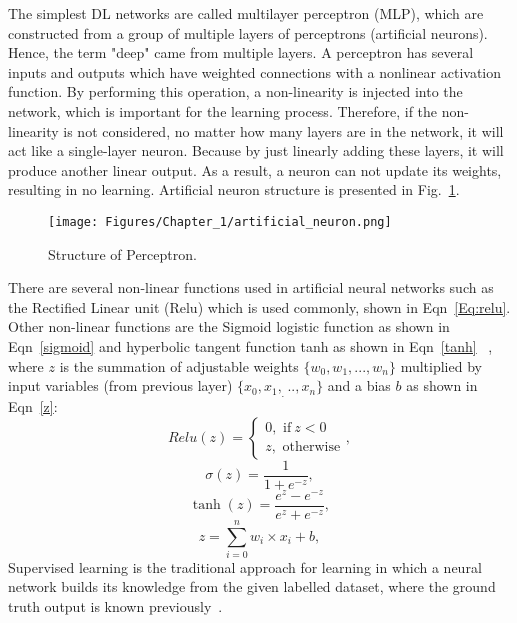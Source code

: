The simplest DL networks are called multilayer perceptron (MLP), which are constructed from a group of multiple layers of perceptrons (artificial neurons).
Hence, the term "deep" came from multiple layers.
A perceptron has several inputs and outputs which have weighted connections with a nonlinear activation function.
By performing this operation, a non-linearity is injected into the network, which is important for the learning process.
Therefore, if the non-linearity is not considered, no matter how many layers are in the network, it will act like a single-layer neuron. 
Because by just linearly adding these layers, it will produce another linear output.
As a result, a neuron can not update its weights, resulting in no learning. 
Artificial neuron structure is presented in Fig.~\ref{fig:artificial Neuron}.
\begin{figure} [!ht]
	\begin{center}
		\centering
		\texttt{[image: Figures/Chapter\_1/artificial\_neuron.png]}
	\end{center}
	\caption{Structure of Perceptron.} 
	\label{fig:artificial Neuron}
\end{figure}
There are several non-linear functions used in artificial neural networks such as the Rectified Linear unit (Relu) which is used commonly, shown in Eqn~\ref{Eq:relu}. Other non-linear functions are the Sigmoid logistic function as shown in Eqn~\ref{sigmoid} and hyperbolic tangent function tanh as shown in Eqn~\ref{tanh} ~\cite{Lecun2015}, where \(z\) is the summation of adjustable weights \(\{w_0,w_1,...,w_n \}\) multiplied by input variables (from previous layer) \(\{x_0,x_1,_...,x_n\}\) and a bias \(b\) as shown in Eqn~\ref{z}:
\begin{equation}
	Relu(z) = 
	\begin{cases}
		0,  \text{  if}\ z<0\\
		z,  \text{  otherwise}
	\end{cases},
	\label{Eq:relu}
\end{equation}
\begin{equation}
	\sigma(z) = \frac{1}{1+e^{-z}},
	\label{sigmoid}
\end{equation}
\begin{equation}
	\tanh(z)=  \frac{e^z-e^{-z}}{e^z+e^{-z}},
	\label{tanh}
\end{equation}
\begin{equation}
	z= \sum_{i=0}^{n}  w_i\times x_i +b,
	\label{z}
\end{equation}
Supervised learning is the traditional approach for learning in which a neural network builds its knowledge from the given labelled dataset, where the ground truth output is known previously~\cite{Lecun2015}.

